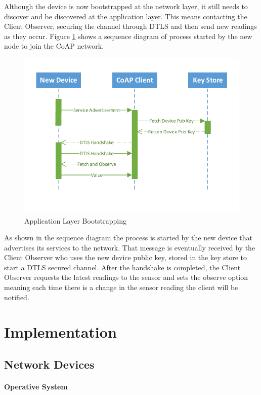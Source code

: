 Although the device is now bootstrapped at the network layer, it still needs to discover and be discovered at the application layer. This means contacting the Client Observer, securing the channel through \gls{DTLS} and then send new readings as they occur. Figure \ref{fig:sequence_application_admission} shows a sequence diagram of process started by the new node to join the \gls{CoAP} network.

\begin{figure}[h]
  \centering
  \includegraphics[width=0.8\linewidth]{figures/Sequence_Application_Admission.pdf}
  \caption{Application Layer Bootstrapping}
  \label{fig:sequence_application_admission}
\end{figure}

As shown in the sequence diagram the process is started by the new device that advertises its services to the network. That message is eventually received by the Client Observer who uses the new device public key, stored in the key store to start a \gls{DTLS} secured channel. After the handshake is completed, the Client Observer requests the latest readings to the sensor and sets the observe option meaning each time there is a change in the sensor reading the client will be notified.

\section{Implementation}

\subsection{Network Devices}

\paragraph{\textbf{Operative System}}
